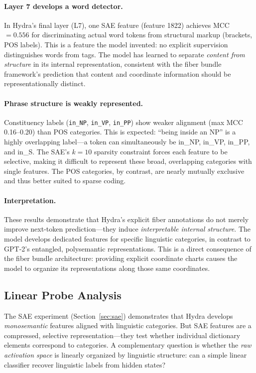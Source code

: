 \documentclass[11pt]{article}
\begin{document}
\paragraph{Layer 7 develops a word detector.}
In Hydra's final layer (L7), one SAE feature (feature 1822) achieves 
MCC~$= 0.556$ for discriminating actual word tokens from structural markup 
(brackets, POS labels). This is a feature the model invented: no explicit 
supervision distinguishes words from tags. The model has learned to separate 
\emph{content from structure} in its internal representation, consistent with 
the fiber bundle framework's prediction that content and coordinate information 
should be representationally distinct.

\paragraph{Phrase structure is weakly represented.}
Constituency labels (\texttt{in\_NP}, \texttt{in\_VP}, \texttt{in\_PP}) show 
weaker alignment (max MCC 0.16--0.20) than POS categories. This is expected: 
``being inside an NP'' is a highly overlapping label---a token can simultaneously 
be in\_NP, in\_VP, in\_PP, and in\_S. The SAE's $k=10$ sparsity constraint 
forces each feature to be selective, making it difficult to represent these 
broad, overlapping categories with single features. The POS categories, by 
contrast, are nearly mutually exclusive and thus better suited to sparse coding.

\paragraph{Interpretation.}
These results demonstrate that Hydra's explicit fiber annotations do not 
merely improve next-token prediction---they induce \emph{interpretable internal 
structure}. The model develops dedicated features for specific linguistic 
categories, in contrast to GPT-2's entangled, polysemantic representations. 
This is a direct consequence of the fiber bundle architecture: providing 
explicit coordinate charts causes the model to organize its representations 
along those same coordinates.

\subsection{Linear Probe Analysis}
\label{sec:probes}

The SAE experiment (Section~\ref{sec:sae}) demonstrates that Hydra develops 
\emph{monosemantic} features aligned with linguistic categories. But SAE 
features are a compressed, selective representation---they test whether 
individual dictionary elements correspond to categories. A complementary 
question is whether the \emph{raw activation space} is linearly organized 
by linguistic structure: can a simple linear classifier recover linguistic 
labels from hidden states?
\end{document}

